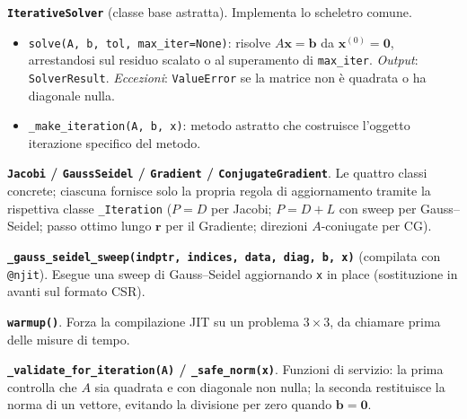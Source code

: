 \documentclass[11pt,a4paper]{article}
\begin{document}
\noindent\textbf{\texttt{IterativeSolver}} (classe base astratta). Implementa lo
scheletro comune.
\begin{itemize}[leftmargin=1.6em]
  \item \texttt{solve(A, b, tol, max\_iter=None)}: risolve $A\mathbf{x}=\mathbf{b}$
  da $\mathbf{x}^{(0)}=\mathbf{0}$, arrestandosi sul residuo scalato o al
  superamento di \texttt{max\_iter}. \emph{Output}: \texttt{SolverResult}.
  \emph{Eccezioni}: \texttt{ValueError} se la matrice non è quadrata o ha
  diagonale nulla.
  \item \texttt{\_make\_iteration(A, b, x)}: metodo astratto che costruisce
  l'oggetto iterazione specifico del metodo.
\end{itemize}

\noindent\textbf{\texttt{Jacobi} / \texttt{GaussSeidel} / \texttt{Gradient} /
\texttt{ConjugateGradient}}. Le quattro classi concrete; ciascuna fornisce solo la
propria regola di aggiornamento tramite la rispettiva classe \texttt{\_Iteration}
($P=D$ per Jacobi; $P=D+L$ con sweep per Gauss--Seidel; passo ottimo lungo
$\mathbf{r}$ per il Gradiente; direzioni $A$-coniugate per CG).

\noindent\textbf{\texttt{\_gauss\_seidel\_sweep(indptr, indices, data, diag, b,
x)}} (compilata con \texttt{@njit}). Esegue una sweep di Gauss--Seidel
aggiornando \texttt{x} in place (sostituzione in avanti sul formato CSR).

\noindent\textbf{\texttt{warmup()}}. Forza la compilazione JIT su un problema
$3\times3$, da chiamare prima delle misure di tempo.

\noindent\textbf{\texttt{\_validate\_for\_iteration(A)} / \texttt{\_safe\_norm(x)}}.
Funzioni di servizio: la prima controlla che $A$ sia quadrata e con diagonale non
nulla; la seconda restituisce la norma di un vettore, evitando la divisione per
zero quando $\mathbf{b}=\mathbf{0}$.
\end{document}
